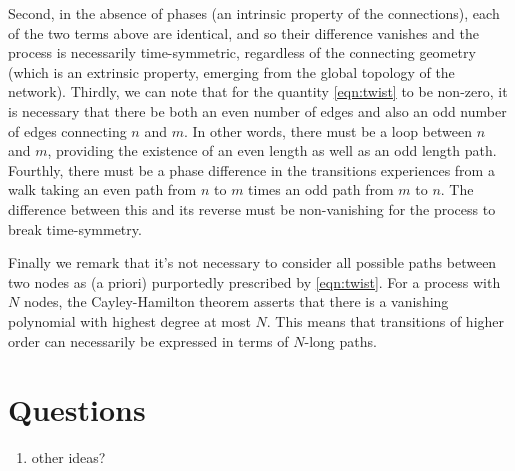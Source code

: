 \documentclass[aps,12pt,nofootinbib,superscriptaddress,longbibliography,
showpacs]{revtex4-1}
\theoremstyle{plain}
\theoremstyle{definition}
\begin{document}
Second, in the absence of
phases (an intrinsic property of the connections), each of the two terms above
are identical, and so their difference vanishes and the process is necessarily
time-symmetric, regardless of the connecting geometry (which is an extrinsic
property, emerging from the global topology of the network). Thirdly, we can
note that for the quantity \eqref{eqn:twist} to be non-zero, it is necessary
that
there be both an even number of edges and also an odd number of edges
connecting $n$ and $m$.  In other words, there must be a loop
between $n$ and $m$, providing the existence of an even length as well as an odd
length path. Fourthly, there must be a phase difference in the transitions
experiences from a walk taking an even path from $n$ to $m$ times an odd path
from $m$ to $n$. The difference between this and its reverse must be
non-vanishing for the process to break time-symmetry.  


Finally we remark that it's not necessary to consider all possible paths
between two nodes as (a priori) purportedly prescribed by \eqref{eqn:twist}. 
For a process with $N$ nodes, the Cayley-Hamilton theorem asserts that there is
a vanishing polynomial with highest degree at most $N$. This means that
transitions of higher order can necessarily be expressed in terms of $N$-long
paths.  


\section{Questions}

\begin{enumerate} 
\item other ideas?   
\end{enumerate} 








\end{document}
